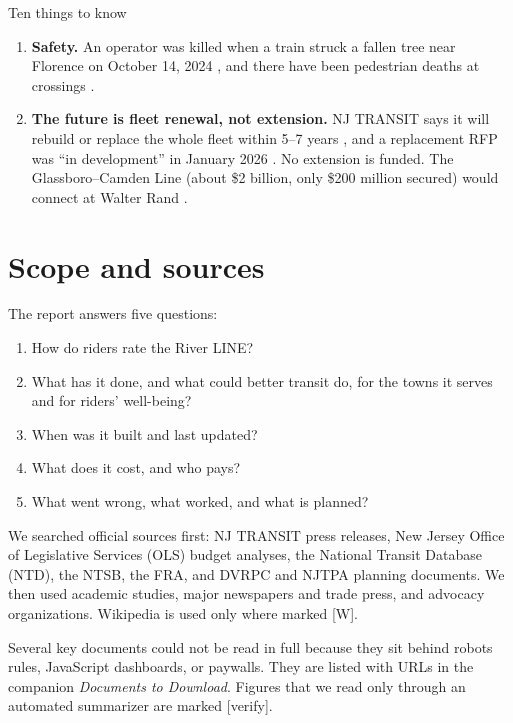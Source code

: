 \documentclass[11pt]{article}
\newcommand{\flag}[1]{\textcolor{sb}{\textsf{[#1]}}}
\begin{document}
\begin{keybox}{Ten things to know}
\begin{enumerate}[leftmargin=*]
\item \textbf{Safety.} An operator was killed when a train struck a fallen tree near Florence on October 14, 2024 \citep{ntsb2025}, and there have been pedestrian deaths at crossings \citep{singleton2025}.
\item \textbf{The future is fleet renewal, not extension.} NJ TRANSIT says it will rebuild or replace the whole fleet within 5--7 years \citep{centraljersey2025}, and a replacement RFP was ``in development'' in January 2026 \citep{njt2026rehab}. No extension is funded. The Glassboro--Camden Line (about \$2 billion, only \$200 million secured) would connect at Walter Rand \citep{inquirer2026gcl}.
\end{enumerate}
\end{keybox}

\section{Scope and sources}
The report answers five questions:
\begin{enumerate}
\item How do riders rate the River LINE?
\item What has it done, and what could better transit do, for the towns it serves and for riders' well-being?
\item When was it built and last updated?
\item What does it cost, and who pays?
\item What went wrong, what worked, and what is planned?
\end{enumerate}
We searched official sources first: NJ TRANSIT press releases, New Jersey Office of Legislative Services (OLS) budget analyses, the National Transit Database (NTD), the NTSB, the FRA, and DVRPC and NJTPA planning documents. We then used academic studies, major newspapers and trade press, and advocacy organizations. Wikipedia is used only where marked \flag{W}.

Several key documents could not be read in full because they sit behind robots rules, JavaScript dashboards, or paywalls. They are listed with URLs in the companion \emph{Documents to Download}. Figures that we read only through an automated summarizer are marked \flag{verify}.
\end{document}
